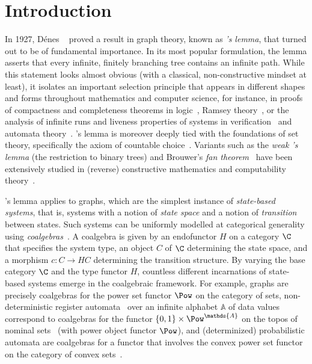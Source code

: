 \section{Introduction}
In 1927, Dénes \Konig~\cite{konig1927} proved a result in graph theory, known as \emph{\Konig's lemma}, that turned out to be of fundamental importance. In its most popular formulation, the lemma asserts that every infinite, finitely branching tree contains an infinite path. While this statement looks almost obvious (with a classical, non-constructive mindset at least), it isolates an important selection principle that appears in different shapes and forms throughout mathematics and computer science, for instance, in proofs of compactness and completeness theorems in logic~\cite{teller89}, Ramsey theory~\cite{szekely23}, or the analysis of infinite runs and liveness properties of systems in verification~\cite{brv04} and automata theory~\cite{gmms14,isb16}. \Konig's lemma is moreover deeply tied with the foundations of set theory, specifically the axiom of countable choice~\cite{hr98,jech02}. Variants such as the \emph{weak \Konig's lemma} (the restriction to binary trees) and Brouwer's \emph{fan theorem}~\cite{brouwer27} have been extensively studied in (reverse) constructive mathematics and computability theory~\cite{di21,hirschfeldt14}.

\Konig's lemma applies to graphs, which are the simplest instance of \emph{state-based systems}, that is, systems with a notion of \emph{state space} and a notion of \emph{transition} between states. Such systems can be uniformly modelled at categorical generality using \emph{coalgebras}~\cite{jacobs16,rutten00}. A {coalgebra} is given by an endofunctor $H$ on a category $\C$ that specifies the {system type}, an object $C$ of $\C$ determining the state space, and a morphism $c\colon C\to HC$ determining the transition structure. By varying the base category $\C$ and the type functor $H$, countless different incarnations of state-based systems emerge in the coalgebraic framework. For example, graphs are precisely coalgebras for the power set functor $\Pow$ on the category of sets, non-deterministic register automata~\cite{KaminskiFrancez94} over an infinite alphabet $\mathds{A}$ of data values correspond to coalgebras for the functor $\{0,1\}\times \Pow^{\mathds{A}}$ on the topos of nominal sets~\cite{BojanczykEA14} (with power object functor $\Pow$), and (determinized) probabilistic automata are coalgebras for a functor that involves the convex power set functor on the category of convex sets~\cite{bss17}.

